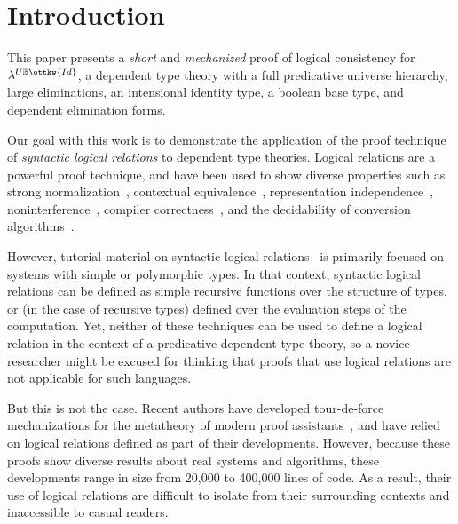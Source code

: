 \documentclass[acmsmall,screen=true,
\ifpublic review=false\else,review=true\fi
  ,anonymous=\ifanonymous true\else false\fi]{acmart}
\newcommand{\lang}{$\lambda^{U\mathbb{B}\ottkw{Id}}$\xspace}
\newcommand{\scw}[1]{}
\begin{document}
\maketitle

\section{Introduction}
This paper presents a \emph{short} and \emph{mechanized} proof of
logical consistency for \lang{}, a dependent type theory with a full
predicative universe hierarchy, large eliminations, an intensional identity
type, a boolean base type, and dependent elimination forms.

Our goal with this work is to demonstrate the application of the proof
technique of \emph{syntactic logical relations} to dependent type theories.
Logical relations are a powerful proof technique, and have been used to show
diverse properties such as strong normalization~\citep{girard1989proofs,
  geuvers1994short}, contextual equivalence~\citep{constable1986implementing},
representation independence~\citep{pitts1998existential},
noninterference~\citep{bowman2015noninterference}, compiler
correctness~\citep{benton2009biorthogonality,perconti2014compiler}, and the
decidability of conversion
algorithms~\citep{harper2005equivalence,Abel12,abel2013normalization}.

However, tutorial material on syntactic logical
relations~\citep{skorstengaard2019introduction, harpertait, harperkripke,
  pierce2002types, pierce2004advanced,harper2016practical} is primarily
focused on systems with simple or polymorphic types. In that context,
syntactic logical relations can be defined as simple recursive functions over
the structure of types, or (in the case of recursive types) defined over the
evaluation steps of the computation. Yet, neither of these techniques can be
used to define a logical relation in the context of a predicative dependent
type theory, so a novice researcher might be excused for thinking that proofs
that use logical relations are not applicable for such languages.

But this is not the case. \scw{Add a sentence about pen-and-paper LR proofs
  for dependent type theories?} Recent authors have developed tour-de-force
mechanizations for the metatheory of modern proof
assistants~\citep{nbeincoq,decagda,martin-lof-a-la-coq,anand2014towards}, and
have relied on logical relations defined as part of their
developments. However, because these proofs show diverse results about real
systems and algorithms, these developments range in size from 20,000 to
400,000 lines of code. As a result, their use of logical relations are
difficult to isolate from their surrounding contexts and inaccessible
to casual readers.
\end{document}
